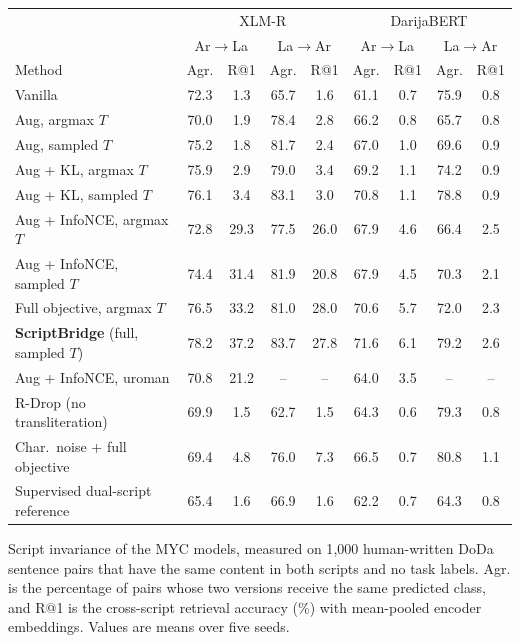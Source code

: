 \begin{lrbox}{\tblbox}\footnotesize\setlength{\tabcolsep}{3pt}%
\begin{tabular}{@{}lcccccccc@{}}
\toprule
 & \multicolumn{4}{c}{XLM-R} & \multicolumn{4}{c}{DarijaBERT}\\
\cmidrule(lr){2-5}\cmidrule(lr){6-9}
 & \multicolumn{2}{c}{Ar$\to$La} & \multicolumn{2}{c}{La$\to$Ar} & \multicolumn{2}{c}{Ar$\to$La} & \multicolumn{2}{c}{La$\to$Ar}\\
Method & Agr. & R@1 & Agr. & R@1 & Agr. & R@1 & Agr. & R@1\\
\midrule
Vanilla & 72.3 & 1.3 & 65.7 & 1.6 & 61.1 & 0.7 & 75.9 & 0.8\\
Aug, argmax $T$ & 70.0 & 1.9 & 78.4 & 2.8 & 66.2 & 0.8 & 65.7 & 0.8\\
Aug, sampled $T$ & 75.2 & 1.8 & 81.7 & 2.4 & 67.0 & 1.0 & 69.6 & 0.9\\
Aug + KL, argmax $T$ & 75.9 & 2.9 & 79.0 & 3.4 & 69.2 & 1.1 & 74.2 & 0.9\\
Aug + KL, sampled $T$ & 76.1 & 3.4 & 83.1 & 3.0 & 70.8 & 1.1 & 78.8 & 0.9\\
Aug + InfoNCE, argmax $T$ & 72.8 & 29.3 & 77.5 & 26.0 & 67.9 & 4.6 & 66.4 & 2.5\\
Aug + InfoNCE, sampled $T$ & 74.4 & 31.4 & 81.9 & 20.8 & 67.9 & 4.5 & 70.3 & 2.1\\
Full objective, argmax $T$ & 76.5 & 33.2 & 81.0 & 28.0 & 70.6 & 5.7 & 72.0 & 2.3\\
\textbf{ScriptBridge} (full, sampled $T$) & 78.2 & 37.2 & 83.7 & 27.8 & 71.6 & 6.1 & 79.2 & 2.6\\
Aug + InfoNCE, uroman & 70.8 & 21.2 & -- & -- & 64.0 & 3.5 & -- & --\\
R-Drop (no transliteration) & 69.9 & 1.5 & 62.7 & 1.5 & 64.3 & 0.6 & 79.3 & 0.8\\
Char.\ noise + full objective & 69.4 & 4.8 & 76.0 & 7.3 & 66.5 & 0.7 & 80.8 & 1.1\\
Supervised dual-script reference & 65.4 & 1.6 & 66.9 & 1.6 & 62.2 & 0.7 & 64.3 & 0.8\\
\bottomrule
\end{tabular}%
\end{lrbox}
\begin{table}[t]
\caption{Script invariance of the MYC models, measured on 1{,}000 human-written DoDa sentence pairs that have the same content in both scripts and no task labels. Agr. is the percentage of pairs whose two versions receive the same predicted class, and R@1 is the cross-script retrieval accuracy (\%) with mean-pooled encoder embeddings. Values are means over five seeds.}
\label{tab:invariance}
\centering\footnotesize
\setlength{\tabcolsep}{3pt}
\fitbox{\linewidth}
\end{table}